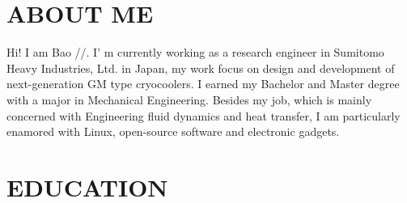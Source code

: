 \documentclass[12pt,A4]{res}
\begin{document}
 


\address{\textbf{PRESENT ADDRESS}\\Yato-cho 2chome 2-9 Room 510\\Nishitokyo-city,Tokyo\\Japan, Postcode: 188-0001}
\address{\textbf{CONTACT INFO} \\ Email: houkensjtu@gmail.com \\ Mobile: +81-090-9427-1113 \\  Phone: +81-042-468-4474}
                                  
\begin{resume}

\section{ABOUT ME}          
Hi! I am Bao //. I' m currently working as a research engineer in Sumitomo Heavy Industries, Ltd. in Japan,
 my work focus on design and development of next-generation GM type cryocoolers. I earned my Bachelor and Master degree
 with a major in Mechanical Engineering. Besides my job, which is mainly concerned with Engineering fluid dynamics and heat transfer,
  I am particularly enamored with Linux, open-source software and electronic gadgets.


\section{EDUCATION}      
    \vspace{-0.1in}	    


\end{resume}
\end{document}

